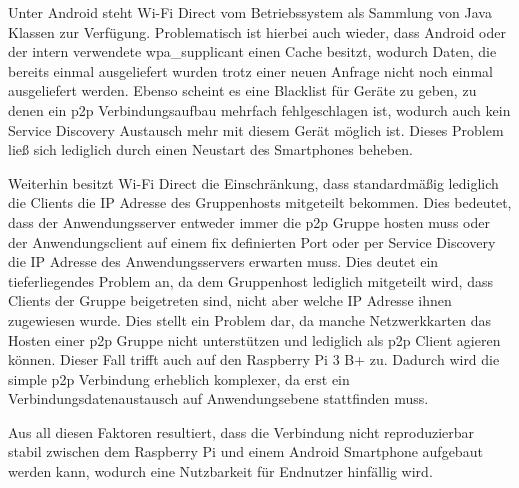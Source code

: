 		Unter Android steht Wi-Fi Direct vom Betriebssystem als Sammlung von Java Klassen zur Verfügung. Problematisch ist hierbei auch wieder, dass Android oder der intern verwendete wpa\_supplicant einen Cache besitzt, wodurch Daten, die bereits einmal ausgeliefert wurden trotz einer neuen Anfrage nicht noch einmal ausgeliefert werden. Ebenso scheint es eine Blacklist für Geräte zu geben, zu denen ein p2p Verbindungsaufbau mehrfach fehlgeschlagen ist, wodurch auch kein Service Discovery Austausch mehr mit diesem Gerät möglich ist. Dieses Problem ließ sich lediglich durch einen Neustart des Smartphones beheben.
		
		Weiterhin besitzt Wi-Fi Direct die Einschränkung, dass standardmäßig lediglich die Clients die IP Adresse	des Gruppenhosts mitgeteilt bekommen. Dies bedeutet, dass der Anwendungsserver entweder immer die p2p Gruppe hosten muss oder der Anwendungsclient auf einem fix definierten Port oder per Service Discovery die IP Adresse des Anwendungsservers erwarten muss. Dies deutet ein tieferliegendes Problem an, da dem Gruppenhost lediglich mitgeteilt wird, dass Clients der Gruppe beigetreten sind, nicht aber welche IP Adresse ihnen zugewiesen wurde. Dies stellt ein Problem dar, da manche Netzwerkkarten das Hosten einer p2p Gruppe nicht unterstützen und lediglich als p2p Client agieren können. Dieser Fall trifft auch auf den Raspberry Pi 3 B+ zu. Dadurch wird die simple p2p Verbindung erheblich komplexer, da erst ein Verbindungsdatenaustausch auf Anwendungsebene stattfinden muss.
		
		Aus all diesen Faktoren resultiert, dass die Verbindung nicht reproduzierbar stabil zwischen dem Raspberry Pi und einem Android Smartphone aufgebaut werden kann, wodurch eine Nutzbarkeit für Endnutzer hinfällig wird.
